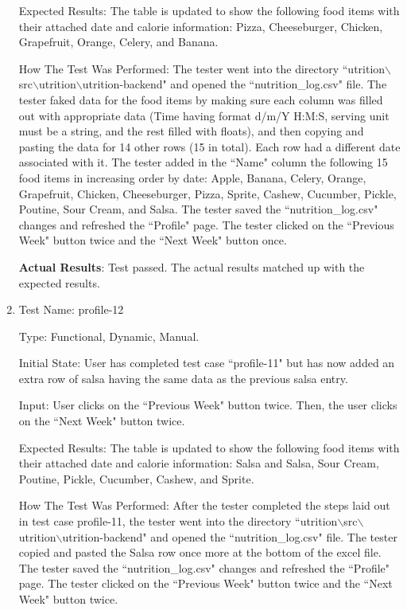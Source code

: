 \documentclass[12pt, titlepage]{article}
\begin{document}
\begin{enumerate}
		Expected Results: The table is updated to show the following food items with their attached date and calorie information: Pizza, Cheeseburger, Chicken, Grapefruit, Orange, Celery, and Banana.
		
		How The Test Was Performed: The tester went into the directory ``utrition$\backslash$src$\backslash$utrition$\backslash$utrition-backend" and opened the ``nutrition\_log.csv" file. The tester faked data for the food items by making sure each column was filled out with appropriate data (Time having format d/m/Y H:M:S, serving unit must be a string, and the rest filled with floats), and then copying and pasting the data for 14 other rows (15 in total). Each row had a different date associated with it. The tester added in the ``Name" column the following 15 food items in increasing order by date: Apple, Banana, Celery, Orange, Grapefruit, Chicken, Cheeseburger, Pizza, Sprite, Cashew, Cucumber, Pickle, Poutine, Sour Cream, and Salsa. The tester saved the ``nutrition\_log.csv" changes and refreshed the ``Profile" page. The tester clicked on the ``Previous Week" button twice and the ``Next Week" button once.
		
		\textbf{Actual Results}: Test passed. The actual results matched up with the expected results.
		
		\item{Test Name: profile-12}
		
		Type: Functional, Dynamic, Manual.
		
		Initial State:  User has completed test case ``profile-11" but has now added an extra row of salsa having the same data as the previous salsa entry.
		
		Input: User clicks on the ``Previous Week" button twice. Then, the user clicks on the ``Next Week" button twice.
		
		Expected Results: The table is updated to show the following food items with their attached date and calorie information: Salsa and Salsa, Sour Cream, Poutine, Pickle, Cucumber, Cashew, and Sprite.
		
		How The Test Was Performed: After the tester completed the steps laid out in test case profile-11, the tester went into the directory ``utrition$\backslash$src$\backslash$utrition$\backslash$utrition-backend" and opened the ``nutrition\_log.csv" file. The tester copied and pasted the Salsa row once more at the bottom of the excel file. The tester saved the ``nutrition\_log.csv" changes and refreshed the ``Profile" page. The tester clicked on the ``Previous Week" button twice and the ``Next Week" button twice.
		

\end{enumerate}
\end{document}
